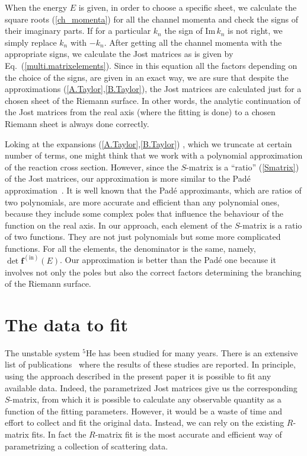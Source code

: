 \documentclass[12pt]{article}
\begin{document}
When the energy $E$ is given, in order to choose a specific sheet, we calculate
the square roots (\ref{ch_momenta}) for all the channel
momenta and check the signs of their imaginary parts. If for a particular $k_n$
the sign of $\mathrm{Im}\,k_n$ is not right, we simply replace $k_n$ with
$-k_n$. After getting all the channel momenta with the appropriate signs, we
calculate the Jost matrices as is given by Eq.~(\ref{multi.matrixelements}).
Since in this equation all the factors depending on the choice of the signs,
are given in an exact way, we are sure that despite the approximations
(\ref{A.Taylor},\ref{B.Taylor}), the Jost matrices are calculated just for a
chosen sheet of the Riemann surface. In other words, the analytic continuation
of the Jost matrices from the real axis (where the fitting is done) to a chosen
Riemann sheet is always done correctly.

Loking at the expansions (\ref{A.Taylor},\ref{B.Taylor}) , which we truncate at
certain number of terms, one might think that we work with a polynomial
approximation of the reaction cross section. However, since the $S$-matrix is a
``ratio'' (\ref{Smatrix}) of the Jost matrices, our approximation is more
similar to the Pad\'{e} approximation~\cite{Press}. It is well known that the
Pad\'{e} approximants, which are ratios of two polynomials, are more accurate
and efficient than any polynomial ones, because they include some complex poles
that influence the behaviour of the function on the real axis. In our approach,
each element of the $S$-matrix is a ratio of two functions. They are not just
polynomials but some more complicated functions. For all the elements, the
denominator is the same, namely, $\det \bm{f}^{\mathrm{(in)}}(E)$. Our
approximation is better than the  Pad\'{e} one because it  involves not only the
poles but also the correct factors determining the branching of the Riemann
surface.

\section{The data to fit}
The unstable system ${}^5\mathrm{He}$ has been studied for many years. There is
an extensive  list of publications~\cite{Tilley} where  the results of these
studies are reported. In principle, using the approach described in the present
paper it is possible to fit any available data. Indeed, the parametrized Jost
matrices give us the corresponding $S$-matrix, from which it is possible to
calculate any observable quantity as a function of the fitting parameters.
However, it would be a waste of time and effort to collect and fit the original
data. Instead, we can rely on the existing $R$-matrix fits. In fact the
$R$-matrix fit is the most accurate and efficient way of parametrizing a
collection of scattering data.
\end{document}

